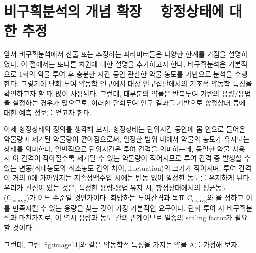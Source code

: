 \documentclass[
  11pt,
  krantz2, a4paper, twoside]{krantz}
\theoremstyle{definition}
\theoremstyle{definition}
\theoremstyle{definition}
\theoremstyle{definition}
\theoremstyle{remark}
\begin{document}
\hypertarget{uxbe44uxad6cuxd68duxbd84uxc11duxc758-uxac1cuxb150-uxd655uxc7a5-uxd56duxc815uxc0c1uxd0dcuxc5d0-uxb300uxd55c-uxcd94uxc815}{%
\section{\texorpdfstring{비구획분석의 개념 확장 -- 항정상태에 대한 추정}{비구획분석의 개념 확장 -- 항정상태에 대한 추정}}\label{uxbe44uxad6cuxd68duxbd84uxc11duxc758-uxac1cuxb150-uxd655uxc7a5-uxd56duxc815uxc0c1uxd0dcuxc5d0-uxb300uxd55c-uxcd94uxc815}}

앞서 비구획분석에서 산출 또는 추정하는 파라미터들은 다양한 한계를 가짐을
설명하였다. 이 절에서는 또다른 차원에 대한 설명을 추가하고자 한다.
비구획분석은 기본적으로 1회의 약물 투여 후 충분한 시간 동안 관찰한 약물
농도를 기반으로 분석을 수행한다. 그렇기에 단회 투여 약동학 연구에서 대상
인구집단에서의 기초적 약동학 특성을 확인하고자 할 때 많이 사용된다.
그런데, 대부분의 약물은 반복투여 기반의 용량/용법을 설정하는 경우가
많으므로, 이러한 단회투여 연구 결과를 기반으로 항정상태 등에 대한 예측
정보를 얻고자 한다.

이제 항정상태의 정의를 생각해 보자. 항정상태는 단위시간 동안에 몸 안으로 들어온 
약물량과 제거된 약물량이 같아짐으로써, 일정한 범위 내에서 약물의 농도가
유지되는 상태를 의미한다. 일반적으로 단위시간은 투여 간격을 의미하는데,
동일한 약물 사용 시 이 간격이 작아질수록 제거될 수 있는 약물량이
적어지므로 투여 간격 중 발생할 수 있는 변동(최대농도와 최소농도 간의
차이, fluctuation)의 크기가 작아지며, 투여 간격이 거의 0에 가까워지는
지속정맥주입 시에는 변동 없이 일정한 농도를 유지하게 된다. 우리가 관심이
있는 것은, 특정한 용량-용법 유지 시, 항정상태에서의
평균농도(C\textsubscript{ss,avg})가 어느 수준일 것인가이다. 희망하는 투여간격과 목표
C\textsubscript{ss,avg}와 을 정하고 이를 만족시킬 수 있는 용량을 찾는 것이 가장
기본적인 요구이다. 단회 투여 시 비구획분석과 마찬가지로, 이 역시 용량과
농도 간의 관계이므로 일종의 scaling factor가 필요할 것이다.

그런데, 그림 \ref{fig:image11}와 같은 약동학적 특성을 가지는 약물 A를 가정해 보자.
\end{document}
